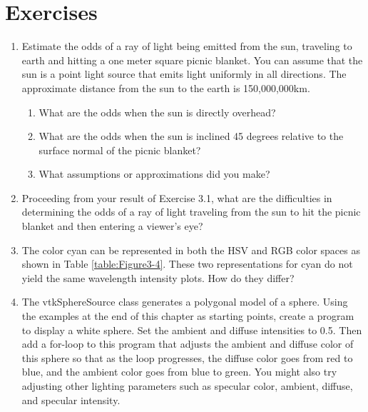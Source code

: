 \printbibliography


\section{Exercises}
\begin{enumerate}

\item Estimate the odds of a ray of light being emitted from the sun, traveling to earth and hitting a one meter square picnic blanket. You can assume that the sun is a point light source that emits light uniformly in all directions. 
The approximate distance from the sun to the earth is 150,000,000km.

\begin{enumerate}

    \item What are the odds when the sun is directly overhead?

    \item What are the odds when the sun is inclined 45 degrees relative to the surface normal of the picnic blanket?

    \item What assumptions or approximations did you make?

\end{enumerate}

\item Proceeding from your result of Exercise 3.1, what are the difficulties in determining the odds of a ray of light traveling from the sun to hit the picnic blanket and then entering a viewer's eye?

\item The color cyan can be represented in both the HSV and RGB color spaces as shown in Table \ref{table:Figure3-4}. These two representations for cyan do not yield the same wavelength intensity plots. How do they differ?

\item \label{exercise:3.4}The vtkSphereSource class generates a polygonal model of a sphere.
Using the examples at the end of this chapter as starting points, create a program to display a white sphere.
Set the ambient and diffuse intensities to 0.5. Then add a for-loop to this program that adjusts the ambient and diffuse color of this sphere so that as the loop progresses, the diffuse color goes from red to blue, and the ambient color goes from blue to green.
You might also try adjusting other lighting parameters such as specular color, ambient, diffuse, and specular intensity.


\end{enumerate}
